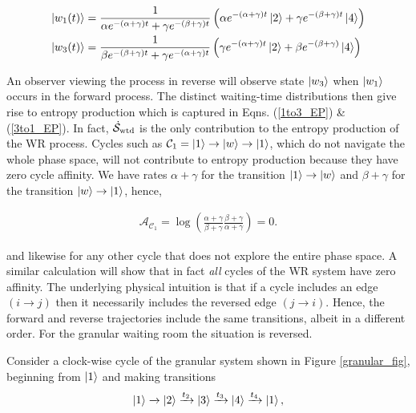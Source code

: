 \begin{align}\label{w-evolutions}
\begin{split}
\ket{w_1(t)} &= \frac{1}{\alpha e^{-(\alpha + \gamma)t}+ \gamma e^{-(\beta + \gamma)t}}\left (\alpha e^{-(\alpha + \gamma)t}\ket{2} + \gamma e^{-(\beta + \gamma)t}\ket{4}\right) \\
\ket{w_3(t)} &= \frac{1}{\beta e^{-(\beta + \gamma)t} + \gamma e^{-(\alpha +\gamma)t}}\left (\gamma e^{-(\alpha + \gamma)t}\ket{2} + \beta e^{-(\beta + \gamma)}\ket{4} \right)
\end{split}
\end{align}

An observer viewing the process in reverse will observe state $\ket{w_3}$ when $\ket{w_1}$ occurs in the forward process. The distinct waiting-time distributions then give rise to entropy production which is captured in Eqns. (\ref{1to3_EP}) \& (\ref{3to1_EP}). In fact, $\dot{\mathcal{S}}_{\text{wtd}}$ is the only contribution to the entropy production of the WR process. Cycles such as $\mathcal{C}_1 = \ket{1} \rightarrow \ket{w} \rightarrow \ket{1}$, which do not navigate the whole phase space, will not contribute to entropy production because they have zero cycle affinity. We have rates $\alpha + \gamma$ for the transition $\ket{1} \rightarrow \ket{w}$ and $\beta + \gamma$ for the transition $\ket{w} \rightarrow \ket{1}$, hence,

\begin{align}
\mathcal{A}_{\mathcal{C}_1} = \log \left( \frac{\alpha + \gamma}{\beta + \gamma}\frac{\beta + \gamma}{\alpha + \gamma}\right) = 0.
\end{align}

and likewise for any other cycle that does not explore the entire phase space. A similar calculation will show that in fact \textit{all} cycles of the WR system have zero affinity. The underlying physical intuition is that if a cycle includes an edge $(i \rightarrow j)$ then it necessarily includes the reversed edge $(j \rightarrow i)$. Hence, the forward and reverse trajectories include the same transitions, albeit in a different order. For the granular waiting room the situation is reversed.

Consider a clock-wise cycle of the granular system shown in Figure \ref{granular_fig}, beginning from $\ket{1}$ and making transitions
\begin{align}
\ket{1}\xrightarrow{} \ket{2}\xrightarrow{t_2} \ket{3}\xrightarrow{t_3} \ket{4}\xrightarrow{t_4} \ket{1},
\end{align}

